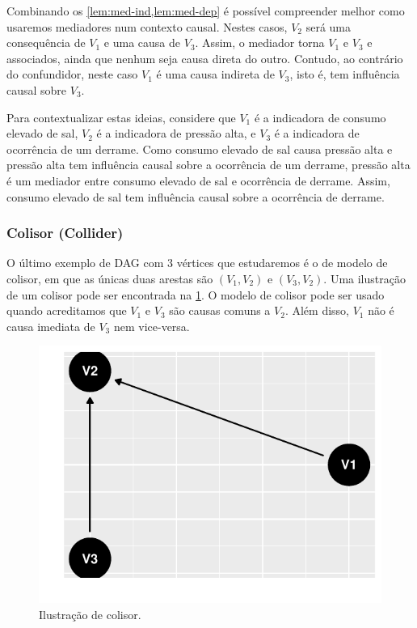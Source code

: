 Combinando os \cref{lem:med-ind,lem:med-dep} é 
possível compreender melhor como 
usaremos mediadores num contexto causal.
Nestes casos, $V_2$ será uma consequência de $V_1$ e
uma causa de $V_3$. Assim, o mediador torna
$V_1$ e $V_3$ e associados, 
ainda que nenhum seja causa direta do outro.
Contudo, ao contrário do confundidor,
neste caso $V_1$ é uma causa indireta de $V_3$,
isto é, tem influência causal sobre $V_3$.

Para contextualizar estas ideias,
considere que $V_1$ é a indicadora de consumo elevado de sal,
$V_2$ é a indicadora de pressão alta, e
$V_3$ é a indicadora de ocorrência de um derrame.
Como consumo elevado de sal causa pressão alta e
pressão alta tem influência causal sobre a ocorrência de um derrame,
pressão alta é um mediador entre consumo elevado de sal e
ocorrência de derrame. Assim,
consumo elevado de sal tem influência causal sobre
a ocorrência de derrame.

\subsubsection{Colisor (Collider)}

O último exemplo de DAG com $3$ vértices que 
estudaremos é o de modelo de colisor, em que
as únicas duas arestas são 
$(V_1, V_2)$ e $(V_3, V_2)$.
Uma ilustração de um colisor
pode ser encontrada 
na \cref{fig:colisor}.
O modelo de colisor pode ser usado quando
acreditamos que $V_1$ e $V_3$ são 
causas comuns a $V_2$. Além disso,
$V_1$ não é causa imediata de $V_3$ 
nem vice-versa.

\begin{knitrout}
\color{fgcolor}\begin{figure}[t]

{\centering \includegraphics[width=\maxwidth]{figure/colisor-1} 

}

\caption[Ilustração de colisor]{Ilustração de colisor.}\label{fig:colisor}
\end{figure}

\end{knitrout}

